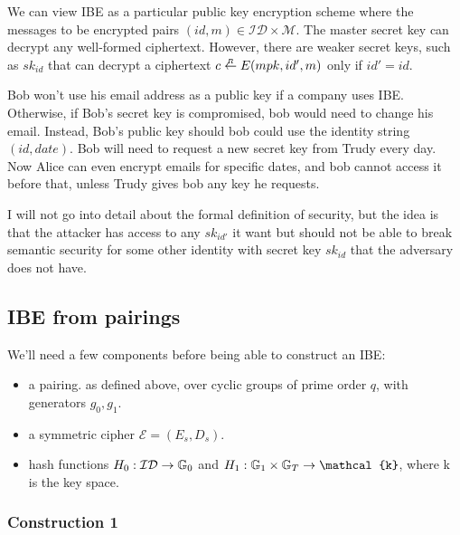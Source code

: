 We can view IBE as a particular public key encryption scheme where the messages
to be encrypted pairs $(id, m)\in\mathcal{ID\times M}$. The master secret key can
decrypt any well-formed ciphertext. However, there are weaker secret keys, 
such as $sk_{id}$ that can decrypt a ciphertext $c\overset{_R}{\leftarrow} E(mpk, id', m)$ only if $id'=id$.


Bob won't use his email address as a public key if a company uses IBE. Otherwise, if Bob's secret key 
is compromised, bob would need to change his email. Instead, Bob's public key
should bob could use the identity string $(id, date)$.
Bob will need to request a new secret key from Trudy every day.
Now Alice can even encrypt emails for specific dates, and bob cannot access it before that, 
unless Trudy gives bob any key he requests.

I will not go into detail about the formal definition of security, but the idea is that
the attacker has access to any $sk_{id'}$ it want but should not be able to break semantic
security for some other identity with secret key $sk_{id}$ that the adversary does not have.


\subsection*{IBE from pairings}
We'll need a few components before being able to construct an IBE: 
\begin{itemize}
  \item a pairing. as defined above, over cyclic groups of prime order $q$, 
  with generators $ g_0, g_1 $.
  \item a symmetric cipher $\mathcal{E}=(E_s,D_s)$.
  \item hash functions $H_0:\mathcal{ID}\to \mathbb{G}_0$ and $H_1:\G_1\times\G_T\to \mathcal{k}$,
  where k is the key space.
\end{itemize}
\subsubsection*{Construction 1}


